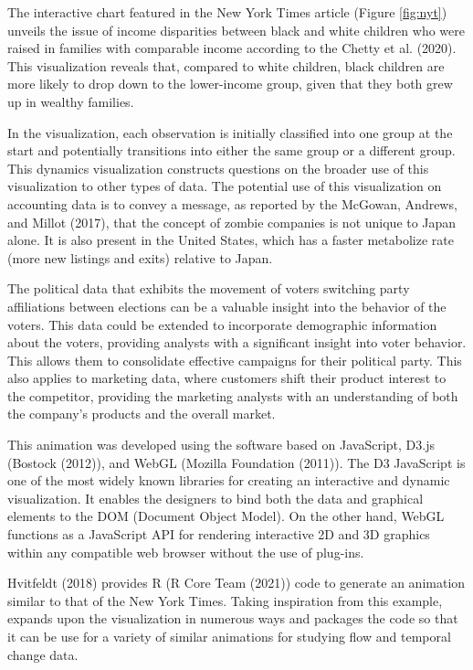 The interactive chart featured in the New York Times article (Figure \ref{fig:nyt}) unveils the issue of income disparities between black and white children who were raised in families with comparable income according to the Chetty et al. (2020). This visualization reveals that, compared to white children, black children are more likely to drop down to the lower-income group, given that they both grew up in wealthy families.

In the visualization, each observation is initially classified into one group at the start and potentially transitions into either the same group or a different group. This dynamics visualization constructs questions on the broader use of this visualization to other types of data. The potential use of this visualization on accounting data is to convey a message, as reported by the McGowan, Andrews, and Millot (2017), that the concept of zombie companies is not unique to Japan alone. It is also present in the United States, which has a faster metabolize rate (more new listings and exits) relative to Japan.

The political data that exhibits the movement of voters switching party affiliations between elections can be a valuable insight into the behavior of the voters. This data could be extended to incorporate demographic information about the voters, providing analysts with a significant insight into voter behavior. This allows them to consolidate effective campaigns for their political party. This also applies to marketing data, where customers shift their product interest to the competitor, providing the marketing analysts with an understanding of both the company's products and the overall market.

This animation was developed using the software based on JavaScript, D3.js (Bostock (2012)), and WebGL (Mozilla Foundation (2011)). The D3 JavaScript is one of the most widely known libraries for creating an interactive and dynamic visualization. It enables the designers to bind both the data and graphical elements to the DOM (Document Object Model). On the other hand, WebGL functions as a JavaScript API for rendering interactive 2D and 3D graphics within any compatible web browser without the use of plug-ins.

Hvitfeldt (2018) provides R (R Core Team (2021)) code to generate an animation similar to that of the New York Times. Taking inspiration from this example,  expands upon the visualization in numerous ways and packages the code so that it can be use for a variety of similar animations for studying flow and temporal change data.

